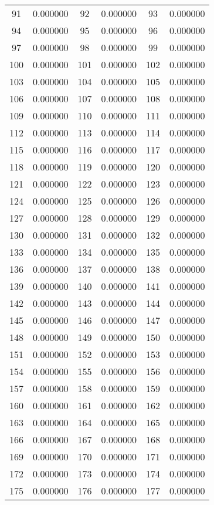 \documentclass[12pt]{article}
\begin{document}
\begin{longtable}{@{}cc|cc|cc@{}}
91 & 0.000000 & 92 & 0.000000 & 93 & 0.000000 \\
94 & 0.000000 & 95 & 0.000000 & 96 & 0.000000 \\
97 & 0.000000 & 98 & 0.000000 & 99 & 0.000000 \\
100 & 0.000000 & 101 & 0.000000 & 102 & 0.000000 \\
103 & 0.000000 & 104 & 0.000000 & 105 & 0.000000 \\
106 & 0.000000 & 107 & 0.000000 & 108 & 0.000000 \\
109 & 0.000000 & 110 & 0.000000 & 111 & 0.000000 \\
112 & 0.000000 & 113 & 0.000000 & 114 & 0.000000 \\
115 & 0.000000 & 116 & 0.000000 & 117 & 0.000000 \\
118 & 0.000000 & 119 & 0.000000 & 120 & 0.000000 \\
121 & 0.000000 & 122 & 0.000000 & 123 & 0.000000 \\
124 & 0.000000 & 125 & 0.000000 & 126 & 0.000000 \\
127 & 0.000000 & 128 & 0.000000 & 129 & 0.000000 \\
130 & 0.000000 & 131 & 0.000000 & 132 & 0.000000 \\
133 & 0.000000 & 134 & 0.000000 & 135 & 0.000000 \\
136 & 0.000000 & 137 & 0.000000 & 138 & 0.000000 \\
139 & 0.000000 & 140 & 0.000000 & 141 & 0.000000 \\
142 & 0.000000 & 143 & 0.000000 & 144 & 0.000000 \\
145 & 0.000000 & 146 & 0.000000 & 147 & 0.000000 \\
148 & 0.000000 & 149 & 0.000000 & 150 & 0.000000 \\
151 & 0.000000 & 152 & 0.000000 & 153 & 0.000000 \\
154 & 0.000000 & 155 & 0.000000 & 156 & 0.000000 \\
157 & 0.000000 & 158 & 0.000000 & 159 & 0.000000 \\
160 & 0.000000 & 161 & 0.000000 & 162 & 0.000000 \\
163 & 0.000000 & 164 & 0.000000 & 165 & 0.000000 \\
166 & 0.000000 & 167 & 0.000000 & 168 & 0.000000 \\
169 & 0.000000 & 170 & 0.000000 & 171 & 0.000000 \\
172 & 0.000000 & 173 & 0.000000 & 174 & 0.000000 \\
175 & 0.000000 & 176 & 0.000000 & 177 & 0.000000 \\

\end{longtable}
\end{document}
